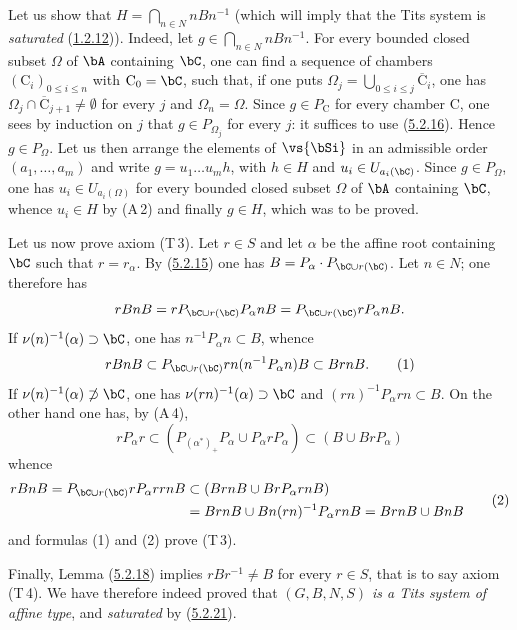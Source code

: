 \documentclass[12pt,a4paper,oneside,english]{smfart}
\makeatletter
\newcommand{\btanchor}[1]{\leavevmode\Hy@raisedlink{\hypertarget{bt:#1}{}}}
\newcommand{\btref}[1]{\hyperlink{bt:#1}{#1}}
\theoremstyle{definition}
\theoremstyle{bt}
\makeatother
\begin{document}
\btanchor{5.2.21}
Let us show that $H=\bigcap_{n\in N}nBn^{-1}$ (which will imply that the Tits
system is \emph{saturated} (\btref{1.2.12})). Indeed, let
$g\in\bigcap_{n\in N}nBn^{-1}$. For every bounded closed subset $\Omega$ of
$\bA$ containing $\bC$, one can find a sequence of chambers
$(\mathrm{C}_{i})_{0\leqslant i\leqslant n}$ with $\mathrm{C}_{0}=\bC$, such
that, if one puts $\Omega_{j}=\bigcup_{0\leqslant i\leqslant j}\overline{\mathrm{C}}_{i}$,
one has $\Omega_{j}\cap\overline{\mathrm{C}}_{j+1}\neq\emptyset$ for every $j$
and $\Omega_{n}=\Omega$. Since $g\in P_{\mathrm{C}}$ for every chamber
$\mathrm{C}$, one sees by induction on $j$ that $g\in P_{\Omega_{j}}$ for every
$j$: it suffices to use (\btref{5.2.16}). Hence $g\in P_{\Omega}$. Let us then arrange
the elements of $\vs{\bSi}$ in an admissible order $(a_{1},\dots,a_{m})$ and
write $g=u_{1}\dots u_{m}h$, with $h\in H$ and $u_{i}\in U_{a_{i}(\bC)}$. Since
$g\in P_{\Omega}$, one has $u_{i}\in U_{a_{i}(\Omega)}$ for every bounded closed
subset $\Omega$ of $\bA$ containing $\bC$, whence $u_{i}\in H$ by (A\,2) and
finally $g\in H$, which was to be proved.

\btanchor{5.2.22}
Let us now prove axiom (T\,3). Let $r\in S$ and let $\alpha$ be the affine root
containing $\bC$ such that $r=r_{\alpha}$. By (\btref{5.2.15}) one has
$B=P_{\alpha}\cdot P_{\bC\cup r(\bC)}$. Let $n\in N$; one therefore has
\[
rBnB=rP_{\bC\cup r(\bC)}P_{\alpha}nB=P_{\bC\cup r(\bC)}rP_{\alpha}nB.
\]
If $\nu(n)^{-1}(\alpha)\supset\bC$, one has $n^{-1}P_{\alpha}n\subset B$, whence
\begin{equation*}
rBnB\subset P_{\bC\cup r(\bC)}rn(n^{-1}P_{\alpha}n)B\subset BrnB.\tag{1}
\end{equation*}
If $\nu(n)^{-1}(\alpha)\not\supset\bC$, one has $\nu(rn)^{-1}(\alpha)\supset\bC$
and $(rn)^{-1}P_{\alpha}rn\subset B$. On the other hand one has, by (A\,4),
\[
rP_{\alpha}r\subset(P_{(\alpha^{*})_{+}}P_{\alpha}\cup P_{\alpha}rP_{\alpha})
\subset(B\cup BrP_{\alpha})
\]
whence
\begin{equation*}
\begin{split}
rBnB=P_{\bC\cup r(\bC)}rP_{\alpha}rrnB&\subset(BrnB\cup BrP_{\alpha}rnB)\\
&=BrnB\cup Bn(rn)^{-1}P_{\alpha}rnB=BrnB\cup BnB
\end{split}\tag{2}
\end{equation*}
and formulas (1) and (2) prove (T\,3).

\btanchor{5.2.23}
Finally, Lemma (\btref{5.2.18}) implies $rBr^{-1}\neq B$ for every $r\in S$, that is to
say axiom (T\,4). We have therefore indeed proved that \emph{$(G,B,N,S)$ is a
Tits system of affine type}, and \emph{saturated} by (\btref{5.2.21}).
\end{document}
